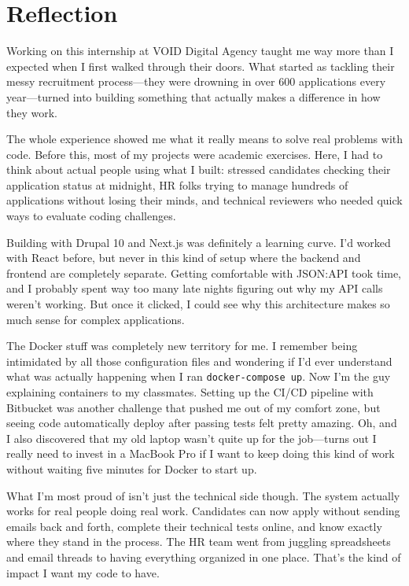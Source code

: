 \chapter{Reflection}
\label{ch:reflection}

\noindent
Working on this internship at VOID Digital Agency taught me way more than I expected when I first walked through their doors. What started as tackling their messy recruitment process—they were drowning in over 600 applications every year—turned into building something that actually makes a difference in how they work.

The whole experience showed me what it really means to solve real problems with code. Before this, most of my projects were academic exercises. Here, I had to think about actual people using what I built: stressed candidates checking their application status at midnight, HR folks trying to manage hundreds of applications without losing their minds, and technical reviewers who needed quick ways to evaluate coding challenges.

Building with Drupal 10 and Next.js was definitely a learning curve. I'd worked with React before, but never in this kind of setup where the backend and frontend are completely separate. Getting comfortable with JSON:API took time, and I probably spent way too many late nights figuring out why my API calls weren't working. But once it clicked, I could see why this architecture makes so much sense for complex applications.

The Docker stuff was completely new territory for me. I remember being intimidated by all those configuration files and wondering if I'd ever understand what was actually happening when I ran \texttt{docker-compose up}. Now I'm the guy explaining containers to my classmates. Setting up the CI/CD pipeline with Bitbucket was another challenge that pushed me out of my comfort zone, but seeing code automatically deploy after passing tests felt pretty amazing. Oh, and I also discovered that my old laptop wasn't quite up for the job—turns out I really need to invest in a MacBook Pro if I want to keep doing this kind of work without waiting five minutes for Docker to start up.

What I'm most proud of isn't just the technical side though. The system actually works for real people doing real work. Candidates can now apply without sending emails back and forth, complete their technical tests online, and know exactly where they stand in the process. The HR team went from juggling spreadsheets and email threads to having everything organized in one place. That's the kind of impact I want my code to have.

